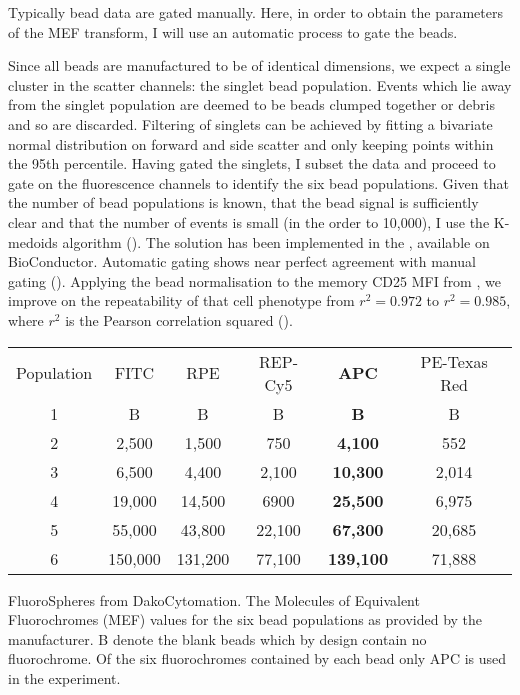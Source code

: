 Typically bead data are gated manually.
Here, in order to obtain the parameters of the MEF transform, I will use an automatic process to gate the beads.

Since all beads are manufactured to be of identical dimensions, we expect a single cluster in the scatter channels: the singlet bead population.
Events which lie away from the singlet population are deemed to be beads clumped together or debris and so are discarded.
Filtering of singlets can be achieved by fitting a bivariate normal distribution on forward and side scatter and only keeping
points within the 95th percentile.
Having gated the singlets, I subset the data and proceed to gate on the fluorescence channels to identify the six bead populations.
Given that the number of bead populations is known, that the bead signal is sufficiently clear and that the number of events is small (in the order to 10,000),
I use the K-medoids algorithm ().
The solution has been implemented in the , available on BioConductor.
Automatic gating shows near perfect agreement with manual gating ().
Applying the bead normalisation to the memory CD25 MFI from , we improve on the repeatability of that 
cell phenotype from $r^2=0.972$ to $r^2=0.985$, where $r^2$ is the Pearson correlation squared ().

\begin{table} [hb]
\begin{center}
\begin{tabular} {|c c c c c c|}
\cline{1-6}
Population  & FITC    & RPE     & REP-Cy5 & \textbf{APC}     & PE-Texas Red\\
\cline{1-6}
1           & B       & B       & B       & \textbf{B}       & B \\
2           & 2,500   & 1,500   & 750     & \textbf{4,100}   & 552\\
3           & 6,500   & 4,400   & 2,100   & \textbf{10,300}  & 2,014\\
4           & 19,000  & 14,500  & 6900    & \textbf{25,500}  & 6,975\\
5           & 55,000  & 43,800  & 22,100  & \textbf{67,300}  & 20,685\\
6           & 150,000 & 131,200 & 77,100  & \textbf{139,100} & 71,888\\
\cline{1-6}
\end{tabular}
\end{center}
{FluoroSpheres from DakoCytomation.}
{
The Molecules of Equivalent Fluorochromes (MEF) values for the six bead populations as provided by the manufacturer.
B denote the blank beads which by design contain no fluorochrome.
Of the six fluorochromes contained by each bead only APC is used in the experiment.
}
\end{table}

